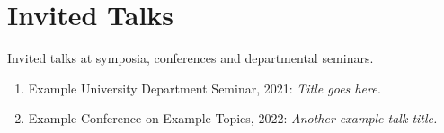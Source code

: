 \section{\sc Invited Talks}

Invited talks at symposia, conferences and departmental seminars.

\begin{enumerate}
\item Example University Department Seminar, 2021: \textit{Title goes here.}

\item Example Conference on Example Topics, 2022: \textit{Another example talk title.}

\end{enumerate}
